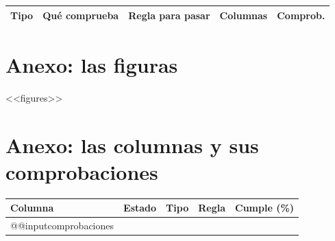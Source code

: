 \begin{center}\small
\begin{tabular}{@{}>{\raggedright\arraybackslash}p{1.9cm}>{\raggedright\arraybackslash}p{5.8cm}>{\raggedright\arraybackslash}p{4.3cm}rr@{}}
\toprule
Tipo & Qué comprueba & Regla para pasar & Columnas & Comprob.\\
\midrule

\end{tabular}
\end{center}

\clearpage
\appendix
\section{Anexo: las figuras}\label{sec:figures}
<<figures>>

\clearpage
\section{Anexo: las columnas y sus comprobaciones}\label{sec:columns}\label{sec:checks}
\begin{small}
\setlength{\tabcolsep}{4pt}
\begin{longtable}{@{}>{\raggedright\arraybackslash}p{3.7cm}>{\raggedright\arraybackslash}p{2.4cm}>{\raggedright\arraybackslash}p{2.1cm}>{\raggedright\arraybackslash}p{4.8cm}r@{}}
\toprule
Columna & Estado & Tipo & Regla & Cumple (\%)\\
\midrule
\endhead
\bottomrule
\endfoot
\csname @@input\endcsname comprobaciones   %
\end{longtable}
\end{small}


